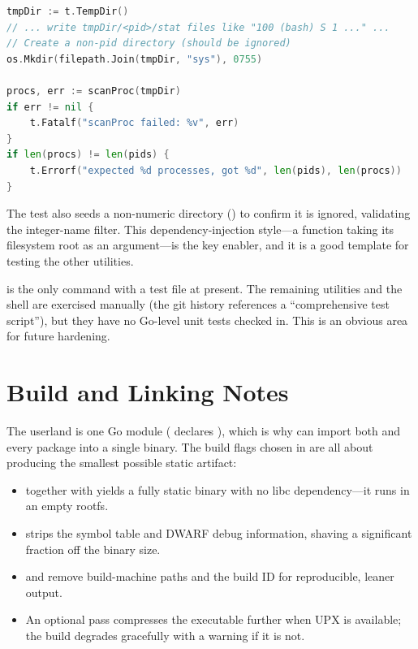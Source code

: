 \begin{lstlisting}[language=Go, caption={Testing /proc parsing against a synthetic tree (utils/cmd/ps/ps\_test.go)}]
tmpDir := t.TempDir()
// ... write tmpDir/<pid>/stat files like "100 (bash) S 1 ..." ...
// Create a non-pid directory (should be ignored)
os.Mkdir(filepath.Join(tmpDir, "sys"), 0755)

procs, err := scanProc(tmpDir)
if err != nil {
    t.Fatalf("scanProc failed: %v", err)
}
if len(procs) != len(pids) {
    t.Errorf("expected %d processes, got %d", len(pids), len(procs))
}
\end{lstlisting}

The test also seeds a non-numeric directory () to confirm it is
ignored, validating the integer-name filter. This dependency-injection style---a
function taking its filesystem root as an argument---is the key enabler, and it is
a good template for testing the other utilities.

\begin{notebox}
 is the only command with a test file at present. The remaining
utilities and the shell are exercised manually (the git history references a
``comprehensive test script''), but they have no Go-level unit tests checked in.
This is an obvious area for future hardening.
\end{notebox}

\section{Build and Linking Notes}
\label{sec:userland-build}

The userland is one Go module ( declares ),
which is why  can import both  and every
 package into a single binary. The build flags chosen
in  are all about producing the smallest possible static
artifact:

\begin{itemize}
  \item {} together with  yields a
        fully static binary with no libc dependency---it runs in an empty rootfs.
  \item {} strips the symbol table and DWARF debug
        information, shaving a significant fraction off the binary size.
  \item {} and  remove build-machine paths and the
        build ID for reproducible, leaner output.
  \item An optional  pass compresses the executable
        further when UPX is available; the build degrades gracefully with a
        warning if it is not.
\end{itemize}

